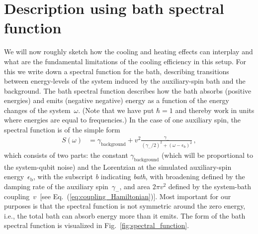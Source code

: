 \documentclass[twocolumn,amsmath,amssymb,pra]{revtex4-2}
\begin{document}
\section{Description using bath spectral function}\label{sec:spectrum_sketch}
We will now roughly sketch how the cooling and heating effects can interplay and what are the fundamental limitations of the cooling efficiency in this setup.
For this we write down a spectral function for the bath, describing transitions between energy-levels of the system induced by the auxiliary-spin bath and the background.
The bath spectral function describes how the bath absorbs (positive energies) and emits (negative negative) energy as a function of the energy changes of the system~$\omega$.
(Note that we have put $\hbar=1$ and thereby work in units where energies are equal to frequencies.)
In the case of one auxiliary spin, the spectral function is of the simple form~\cite{Leppakangas2023}
\begin{align}\label{eq:spectrum_qualitative}
S(\omega) &= \gamma_\textrm{background} + v^2\frac{\gamma_-}{(\gamma_-/2)^2 + (\omega - \epsilon_\textrm{b})^2} \, ,
\end{align}
which  consists of two parts:
the constant $\gamma_\textrm{background}$ (which will be proportional to the system-qubit noise)
and the Lorentzian at the simulated auxiliary-spin energy~$\epsilon_\textrm{b}$, with the subscript \textit{b} indicating \textit{bath},
with broadening defined by the damping rate of the auxiliary spin~$\gamma_-$,
and area $2\pi v^2$ defined by the system-bath coupling~$v$~[see Eq.~(\ref{eq:coupling_Hamiltonian})].
Most important for our purposes is that the spectral function is not symmetric around the zero energy, i.e.,
the total bath can absorb energy more than it emits. 
The form of the bath spectral function is visualized in Fig.~\ref{fig:spectral_function}.
\end{document}
